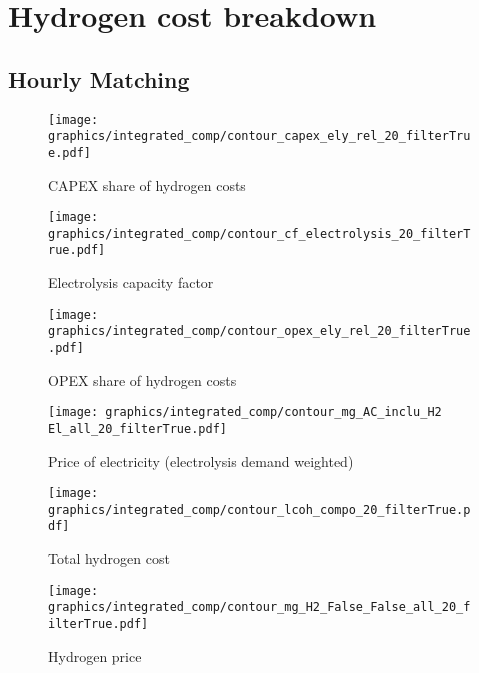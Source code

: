 \section{Hydrogen cost breakdown}
\label{subsec:electrolysis_op_comp}

\subsection{Hourly Matching}

\begin{figure*}[h!]
    \centering
    \begin{subfigure}[b]{0.45\linewidth}
        \centering
        \texttt{[image: graphics/integrated\_comp/contour\_capex\_ely\_rel\_20\_filterTrue.pdf]}
        \caption{CAPEX share of hydrogen costs}
        \label{fig:capex-rel}
    \end{subfigure}
    \hfill
    \begin{subfigure}[b]{0.45\linewidth}
        \centering
        \texttt{[image: graphics/integrated\_comp/contour\_cf\_electrolysis\_20\_filterTrue.pdf]}
        \caption{Electrolysis capacity factor}
        \label{fig:ely-cf}
    \end{subfigure}
    \hfill
    \begin{subfigure}[b]{0.45\linewidth}
        \centering
        \texttt{[image: graphics/integrated\_comp/contour\_opex\_ely\_rel\_20\_filterTrue.pdf]}
        \caption{OPEX share of hydrogen costs}
        \label{fig:opex-rel}
    \end{subfigure}
    \hfill
    \begin{subfigure}[b]{0.45\linewidth}
        \centering
        \texttt{[image: graphics/integrated\_comp/contour\_mg\_AC\_inclu\_H2 El\_all\_20\_filterTrue.pdf]}
        \caption{Price of electricity (electrolysis demand weighted)}
        \label{fig:electricity-price}
    \end{subfigure}
    \hfill
    \begin{subfigure}[b]{0.45\linewidth}
        \centering
        \texttt{[image: graphics/integrated\_comp/contour\_lcoh\_compo\_20\_filterTrue.pdf]}
        \caption{Total hydrogen cost}
        \label{fig:hydrogen-cost}
    \end{subfigure}
    \hfill
    \begin{subfigure}[b]{0.45\linewidth}
        \centering
        \texttt{[image: graphics/integrated\_comp/contour\_mg\_H2\_False\_False\_all\_20\_filterTrue.pdf]}
        \caption{Hydrogen price}
        \label{fig:hydrogen-price}
    \end{subfigure}
    \hfill
    
    \caption{Cost components of hydrogen electrolysis (CAPEX \ref{fig:capex-rel} and \ref{fig:opex-rel}) and combined cost of hydrogen via electrolysis (\ref{fig:hydrogen-cost}) along with the electrolysers capacity factor (\ref{fig:ely-cf} (influencing the CAPEX share)) and price of electricity (\ref{fig:electricity-price}) (influencing the OPEX share). Marginal price of hydrogen \ref{fig:hydrogen-price} for comparison.}
    \label{fig:electrolysis_op_comp}
\end{figure*}


